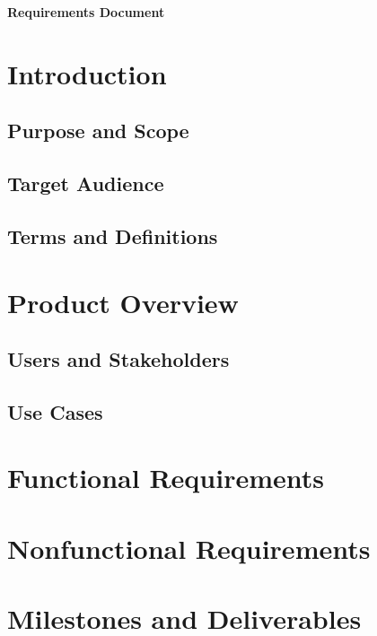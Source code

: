 \documentclass{article}
\renewcommand{\maketitle}{
   \begin{center}
      {\Huge \bfseries Requirements Document}
   \end{center}
}
\begin{document}
\maketitle
\tableofcontents

\section{Introduction}
\subsection{Purpose and Scope}
\subsection{Target Audience}
\subsection{Terms and Definitions}

\section{Product Overview}
\subsection{Users and Stakeholders}
\subsection{Use Cases}

\section{Functional Requirements}

\section{Nonfunctional Requirements}

\section{Milestones and Deliverables}
\end{document}
